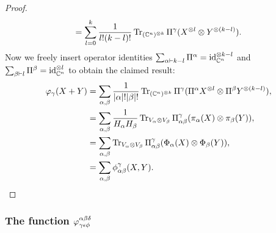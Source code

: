 \documentclass[notitlepage, 11pt, letterpaper]{amsart}
\begin{document}
\begin{proof}
\begin{align}
\begin{split}
            = \sum_{l=0}^k \frac{1}{l! (k-l)!} \operatorname{Tr}_{(\mathbb{C}^n)^{\otimes k}} \Pi^\gamma (X^{\otimes l} \otimes Y^{\otimes (k-l)}).
        \end{split}
    \end{align}
    Now we freely insert operator identities $\sum_{\alpha \vdash k-l} \Pi^{\alpha} = \operatorname{id}_{\mathbb C^n}^{\otimes k-l}$ and $\sum_{\beta \vdash l} \Pi^{\beta} = \operatorname{id}_{\mathbb C^n}^{\otimes l}$ to obtain the claimed result:
    \begin{align}
        \begin{split}
            \varphi_\gamma(X+Y)
            &= \sum_{\alpha, \beta}  \frac{1}{|\alpha|! |\beta|!} \operatorname{Tr}_{(\mathbb{C}^n)^{\otimes k}} \Pi^\gamma (\Pi^{\alpha}X^{\otimes l} \otimes \Pi^{\beta} Y^{\otimes (k-l)}), \\
            &= \sum_{\alpha, \beta}  \frac{1}{H_\alpha H_\beta} \operatorname{Tr}_{V_\alpha \otimes V_\beta} \Pi_{\alpha \beta}^\gamma  (\pi_\alpha(X) \otimes \pi_\beta(Y)), \\
            &= \sum_{\alpha, \beta}  \operatorname{Tr}_{V_\alpha \otimes V_\beta} \Pi_{\alpha \beta}^\gamma  (\Phi_\alpha(X) \otimes \Phi_\beta(Y)), \\
            &= \sum_{\alpha, \beta}  \phi_{\alpha \beta}^\gamma(X,Y).
        \end{split}
    \end{align}
\end{proof}

\subsubsection{The function \texorpdfstring{$\varphi^{\alpha \beta \delta}_{\gamma \epsilon \phi}$}{phiabcdef}}
\end{document}
